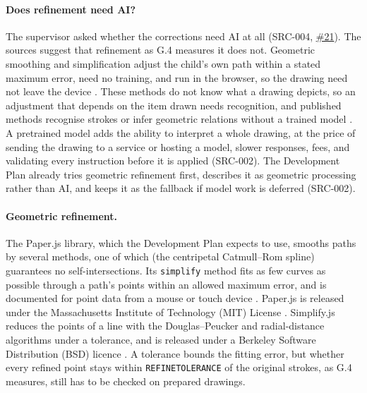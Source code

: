 \documentclass[12pt]{article}
\renewcommand{\_}{\textunderscore\allowbreak}%
\begin{document}
\paragraph{Does refinement need AI?}
The supervisor asked whether the corrections need AI at all (SRC-004,
\href{https://github.com/AHMEDELZARIA/squigglr/issues/21}{\#21}). The sources
suggest that refinement as G.4 measures it does not. Geometric smoothing and
simplification adjust the child's own path within a stated maximum error, need
no training, and run in the browser, so the drawing need not leave the device
\citep{PaperJS2026Path,Agafonkin2013SimplifyJS}. These methods do not know what
a drawing depicts, so an adjustment that depends on the item drawn needs
recognition, and published methods recognise strokes or infer geometric
relations without a trained model \citep{WobbrockEtAl2007,IgarashiEtAl1997}. A
pretrained model adds the ability to interpret a whole drawing, at the price of
sending the drawing to a service or hosting a model, slower responses, fees, and
validating every instruction before it is applied (SRC-002). The Development
Plan already tries geometric refinement first, describes it as geometric
processing rather than AI, and keeps it as the fallback if model work is
deferred (SRC-002).

\paragraph{Geometric refinement.}
The Paper.js library, which the Development Plan expects to use, smooths paths
by several methods, one of which (the centripetal Catmull--Rom spline)
guarantees no self-intersections. Its \texttt{simplify} method fits as few
curves as possible through a path's points within an allowed maximum error, and
is documented for point data from a mouse or touch device
\citep{PaperJS2026Path}. Paper.js is released under the Massachusetts Institute
of Technology (MIT) License \citep{PaperJS2020License}. Simplify.js reduces the
points of a line with the Douglas--Peucker and radial-distance algorithms under
a tolerance, and is released under a Berkeley Software Distribution (BSD)
licence \citep{Agafonkin2013SimplifyJS}. A tolerance bounds the fitting error,
but whether every refined point stays within \texttt{REFINE\_TOLERANCE} of the
original strokes, as G.4 measures, still has to be checked on prepared drawings.
\end{document}
